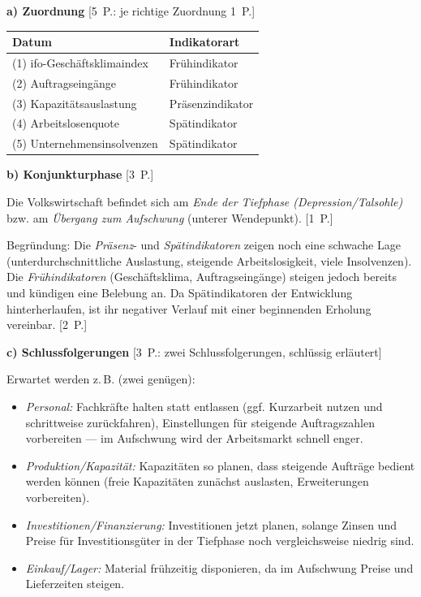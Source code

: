 
\begin{loesung}[title={Lösung Aufgabe~3.1 --- Konjunkturlage richtig deuten}]
\textbf{a) Zuordnung} \hfill [5~P.: je richtige Zuordnung 1~P.]

\begin{tabular}{p{7.6cm} p{5.6cm}}
\toprule
\textbf{Datum} & \textbf{Indikatorart}\\
\midrule
(1) ifo-Geschäftsklimaindex & Frühindikator\\
(2) Auftragseingänge & Frühindikator\\
(3) Kapazitätsauslastung & Präsenzindikator\\
(4) Arbeitslosenquote & Spätindikator\\
(5) Unternehmensinsolvenzen & Spätindikator\\
\bottomrule
\end{tabular}

\medskip
\textbf{b) Konjunkturphase} \hfill [3~P.]

Die Volkswirtschaft befindet sich am \emph{Ende der Tiefphase (Depression/Talsohle)} bzw.
am \emph{Übergang zum Aufschwung} (unterer Wendepunkt). [1~P.]

Begründung: Die \emph{Präsenz}- und \emph{Spätindikatoren} zeigen noch eine schwache Lage
(unterdurchschnittliche Auslastung, steigende Arbeitslosigkeit, viele Insolvenzen). Die
\emph{Frühindikatoren} (Geschäftsklima, Auftragseingänge) steigen jedoch bereits und
kündigen eine Belebung an. Da Spätindikatoren der Entwicklung hinterherlaufen, ist ihr
negativer Verlauf mit einer beginnenden Erholung vereinbar. [2~P.]

\medskip
\textbf{c) Schlussfolgerungen} \hfill [3~P.: zwei Schlussfolgerungen, schlüssig erläutert]

Erwartet werden z.\,B. (zwei genügen):
\begin{itemize}
  \item \emph{Personal:} Fachkräfte halten statt entlassen (ggf. Kurzarbeit nutzen und
    schrittweise zurückfahren), Einstellungen für steigende Auftragszahlen vorbereiten
    --- im Aufschwung wird der Arbeitsmarkt schnell enger.
  \item \emph{Produktion/Kapazität:} Kapazitäten so planen, dass steigende Aufträge
    bedient werden können (freie Kapazitäten zunächst auslasten, Erweiterungen vorbereiten).
  \item \emph{Investitionen/Finanzierung:} Investitionen jetzt planen, solange Zinsen und
    Preise für Investitionsgüter in der Tiefphase noch vergleichsweise niedrig sind.
  \item \emph{Einkauf/Lager:} Material frühzeitig disponieren, da im Aufschwung Preise
    und Lieferzeiten steigen.
\end{itemize}
\end{loesung}

